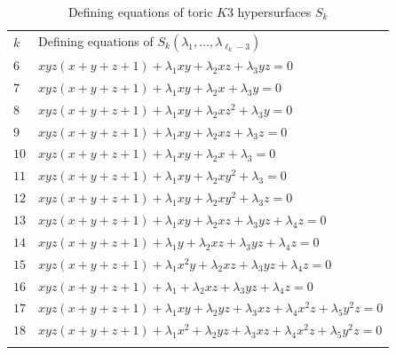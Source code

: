 \documentclass[10pt]{article}
\begin{document}
\vspace{5mm}
\begin{longtable}{ll}
\caption{Defining equations of toric $K3$ hypersurfaces $S_k$}
 \vspace{-1.5mm}
 \\
\hline
  $k$ & Defining equations of $S_k (\lambda_1,\ldots,\lambda_{\ell_k -3})$   
    \\
  \hline
  \endhead
\vspace{1mm}$6$ & $x y z (x + y + z+1) +\lambda_1 x y + \lambda_2 x z + \lambda_3 y z = 0$  \\
\vspace{1mm}$7$ & $xyz(x+y+z+1)+\lambda_1xy+\lambda_2x+\lambda_3y= 0$\\
\vspace{1mm}$8$ & $x y z (x+y+z+1)+\lambda_1 x y+\lambda_2 x z^2+\lambda_3 y=0$\\
\vspace{1mm}$9$ & $x y z (x+y+z+1)+\lambda_1 x y+\lambda_2 x z+\lambda_3 z=0$\\
\vspace{1mm}$10$ & $x y z (x+y+z+1)+\lambda_1 x y+\lambda_2 x+\lambda_3=0$\\
\vspace{1mm}$11$ & $x y z (x+y+z+1)+\lambda_1 x y+\lambda_2 x y^2+\lambda_3=0$\\
\vspace{1mm}$12$ & $x y z (x+y+z+1)+\lambda_1 x y+\lambda_2 x y^2+\lambda_3 z=0$\\
\vspace{1mm}$13$ & $x y z (x+y+z+1)+\lambda_1 x y+\lambda_2 x z+\lambda_3 y z+\lambda_4 z=0$\\
\vspace{1mm}$14$ & $x y z (x + y + z+1) +\lambda_1 y + \lambda_2 x z + \lambda_3 y z + \lambda_4 z=0$\\
\vspace{1mm}$15$ & $ x y z
 (x+y+z+1)+\lambda_1 x^2 y+\lambda_2 x z+\lambda_3 y z+\lambda_4 z=0$\\
 \vspace{1mm}$16$ & $x y z (x+y+z+1)+ \lambda_1+\lambda_2 x z+\lambda_3 y z+\lambda_4 z=0$\\
  \vspace{1mm}$17$ & $x y z (x+y+z+1)+\lambda_1 x y+\lambda_2 y z+\lambda_3 x z+\lambda_4 x^2 z+\lambda_5 y^2 z=0$\\
  $18$ & $x y z (x+y+z+1)+\lambda_1 x^2+\lambda_2 y z+\lambda_3 x z+\lambda_4 x^2
 z+\lambda_5 y^2 z=0$\\
\hline\\
\end{longtable} 
\end{document}
